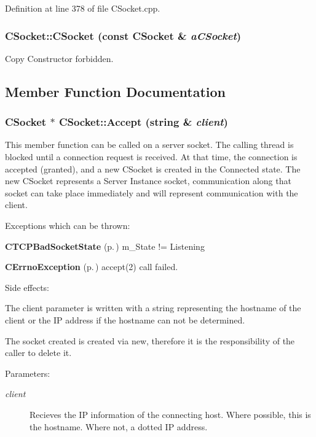 Definition at line 378 of file CSocket.cpp.
\subsubsection{\setlength{\rightskip}{0pt plus 5cm}CSocket::CSocket (const CSocket \& {\em a\-CSocket})\hspace{0.3cm}{\tt  [private]}}\label{classCSocket_c0}


Copy Constructor forbidden.



\subsection{Member Function Documentation}
\subsubsection{\setlength{\rightskip}{0pt plus 5cm}CSocket $\ast$ CSocket::Accept (string \& {\em client})}\label{classCSocket_a9}


This member function can be called on  a server socket. The calling thread is blocked until a connection request is received. At that time, the connection is accepted (granted), and a new CSocket is created in the Connected state. The new CSocket represents a Server Instance socket, communication along that socket can take place immediately and will represent communication with the client.

Exceptions which can be thrown:

\begin{CompactItemize}
\item 
{\bf CTCPBad\-Socket\-State} {\rm (p.\,\pageref{classCTCPBadSocketState})} m\_\-State != Listening\item 
{\bf CErrno\-Exception} {\rm (p.\,\pageref{classCErrnoException})} accept(2) call failed.\end{CompactItemize}
Side effects:

The client parameter is  written with a string representing the hostname of the client or the IP address if the hostname can not be determined.

The socket created is created via new, therefore  it is the responsibility of the caller to delete it.\begin{Desc}
\item[Parameters: ]\par
\begin{description}
\item[{\em 
client}]Recieves the IP information of the connecting host. Where possible, this is the hostname. Where not, a dotted IP address. \end{description}
\end{Desc}


